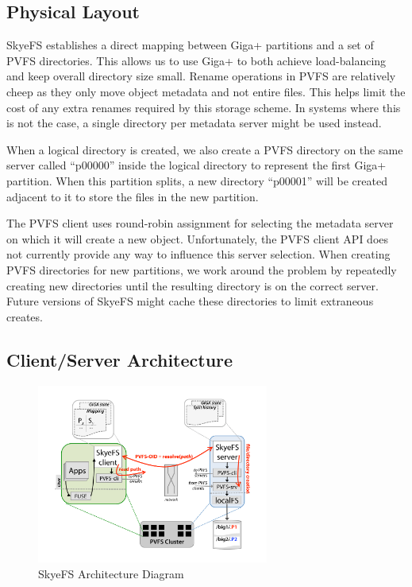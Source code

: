 \documentclass[twocolumn,letterpaper]{article}
\begin{document}
\subsection{Physical Layout}
SkyeFS establishes a direct mapping between Giga+ partitions and a set of PVFS
directories.  This allows us to use Giga+ to both achieve load-balancing and
keep overall directory size small.  Rename operations in PVFS are relatively
cheep as they only move object metadata and not entire files.  This helps limit
the cost of any extra renames required by this storage scheme.  In systems
where this is not the case, a single directory per metadata server might be
used instead.

When a logical directory is created, we also create a PVFS directory on the
same server called ``p00000'' inside the logical directory to represent the
first Giga+ partition.  When this partition splits, a new directory ``p00001''
will be created adjacent to it to store the files in the new partition.  

The PVFS client uses round-robin assignment for selecting the metadata server
on which it will create a new  object.  Unfortunately, the PVFS client API
does not currently provide any way to influence this server selection.  When
creating PVFS directories for new partitions, we work around the problem by
repeatedly creating new directories until the resulting directory is on the
correct server.  Future versions of SkyeFS might cache these directories to
limit extraneous creates.

\subsection{Client/Server Architecture}
\begin{figure}
\begin{center}
\includegraphics[width=3in]{figure-architecture}
\end{center}
\caption{SkyeFS Architecture Diagram}
\end{figure}
\end{document}
